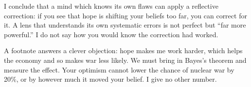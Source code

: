 I conclude that a mind which knows its own flaws can apply a reflective correction: if you see that hope is shifting your beliefs too far, you can correct for it. A lens that understands its own systematic errors is not perfect but ``far more powerful.'' I do not say how you would know the correction had worked. 

A footnote answers a clever objection: hope makes me work harder, which helps the economy and so makes war less likely. We must bring in Bayes's theorem and measure the effect. Your optimism cannot lower the chance of nuclear war by 20\%, or by however much it moved your belief. I give no other number. 
